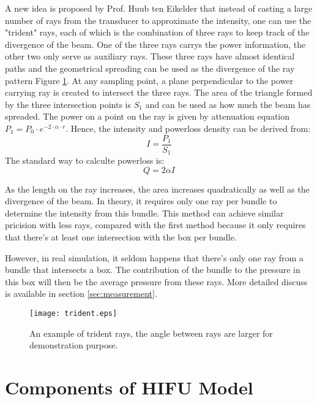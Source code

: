 A new idea is proposed by Prof. Huub ten Eikelder that instead of casting a large number of rays from the transducer to approximate the intensity, one can use the "trident" rays, each of which is the combination of three rays to keep track of the divergence of the beam. One of the three rays carrys the power information, the other two only serve as auxiliary rays. These three rays have almost identical paths and the geometrical spreading can be used as the divergence of the ray pattern Figure \ref{fig:Trident_ray}. At any sampling point, a plane perpendicular to the power carrying ray is created to intersect the three rays. The area of the triangle formed by the three intersection points is $S_1$ and can be used as how much the beam has spreaded. The power on a point on the ray is given by attenuation equation $P_1=P_0\cdot e^{-2\cdot \alpha \cdot r}$. Hence, the intensity and powerloss density can be derived from:
\begin{equation} \label{eq:calc_intensity}
    I=\frac{P_1}{S_1}
\end{equation}
The standard way to calculte powerloss is:
\begin{equation}
    Q=2\alpha I
\end{equation}

As the length on the ray increases, the area increases quadratically as well as the divergence of the beam. In theory, it requires only one ray per bundle to determine the intensity from this bundle. This method can achieve similar pricision with less rays, compared with the first method because it only requires that there's at least one intersection with the box per bundle.

However, in real simulation, it seldom happens that there's only one ray from a bundle that intersects a box. The contribution of the bundle to the pressure in this box will then be the average pressure from these rays. More detailed discuss is available in section \ref{sec:measurement}.

\begin{figure}[h]
    \centering
    \texttt{[image: trident.eps]}
    \caption{An example of trident rays, the angle between rays are larger for demonstration purpose.}
    \label{fig:Trident_ray}
\end{figure}

\section{Components of HIFU Model} \label{sec:components}


